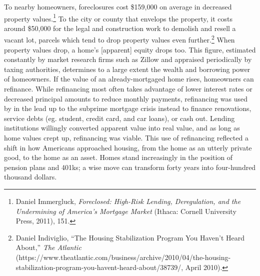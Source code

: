 \documentclass[12pt,oneside]{psthesis}
\begin{document}
To nearby homeowners, foreclosures cost \$159,000 on average in decreased property values.\footnote{Daniel Immergluck, \emph{Foreclosed: High-Risk Lending, Deregulation, and the Undermining of America's Mortgage Market} (Ithaca: Cornell University Press, 2011), 151.}
To the city or county that envelops the property, it costs around \$50,000 for the legal and construction work to demolish and resell a vacant lot, parcels which tend to drop property values even further.\footnote{Daniel Indiviglio, ``The Housing Stabilization Program You Haven't Heard About,'' \emph{The Atlantic} (https://www.theatlantic.com/business/archive/2010/04/the-housing-stabilization-program-you-havent-heard-about/38739/, April 2010).}
When property values drop, a home's {[}apparent{]} equity drops too.
This figure, estimated constantly by market research firms such as Zillow and appraised periodically by taxing authorities, determines to a large extent the wealth and borrowing power of homeowners.
If the value of an already-mortgaged home rises, homeowners can refinance.
While refinancing most often takes advantage of lower interest rates or decreased principal amounts to reduce monthly payments, refinancing was used by in the lead up to the subprime mortgage crisis instead to finance renovations, service debts (eg. student, credit card, and car loans), or cash out.
Lending institutions willingly converted apparent value into real value, and as long as home values crept up, refinancing was viable.
This use of refinancing reflected a shift in how Americans approached housing, from the home as an utterly private good, to the home as an asset.
Homes stand increasingly in the position of pension plans and 401ks; a wise move can transform forty years into four-hundred thousand dollars.
\end{document}

